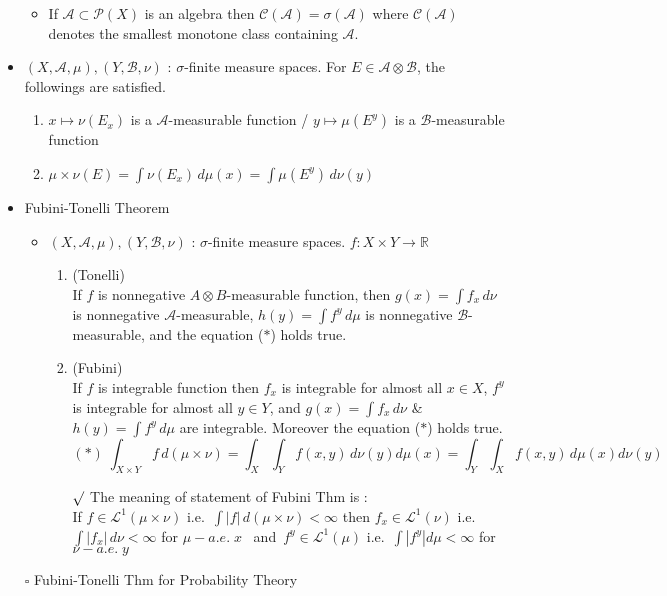\documentclass[12pt]{article}
\newcommand{\sq}{$\square$}
\newcommand{\rmk}{$\surd$}
\newcommand{\R}{\mathbb{R}}
\newcommand{\A}{\mathcal{A}}
\newcommand{\B}{\mathcal{B}}
\newcommand{\C}{\mathcal{C}}
\newcommand{\LL}{\mathcal{L}}
\begin{document}
\begin{itemize}
    \begin{itemize}
        \item If $\A\subset \mathcal{P}(X)$ is an algebra then $\C(\A)=\sigma(\A)$ where $\C(\A)$ denotes the smallest monotone class containing $\A$.
    \end{itemize}
\clearpage
    \item $(X, \A, \mu), (Y,\B, \nu)$ : $\sigma$-finite measure spaces. For $E\in \A\otimes \B$, the followings are satisfied.
    \begin{enumerate}
        \item $x\mapsto \nu(E_x)$ is a $\A$-measurable function / $y\mapsto \mu(E^y)$ is a $\B$-measurable function
        \item $\mu\times\nu(E)=\int \nu(E_x)\,d\mu(x)=\int \mu(E^y)\,d\nu(y)$
    \end{enumerate}
    \item Fubini-Tonelli Theorem
    \begin{itemize}
        \item $(X, \A, \mu), (Y,\B, \nu)$ : $\sigma$-finite measure spaces. $f: X\times Y\rightarrow \R$
        \begin{enumerate}
            \item (Tonelli) \\ If $f$ is nonnegative $A\otimes B$-measurable function, then $g(x)=\int f_x\,d\nu$ is nonnegative $\A$-measurable, $h(y)=\int f^y\,d\mu$ is nonnegative $\B$-measurable, and the equation ($*$) holds true.
            \item (Fubini) \\ If $f$ is integrable function then $f_x$ is integrable for almost all $x\in X$, $f^y$ is integrable for almost all $y\in Y$, and $g(x)=\int f_x\,d\nu$ \& $h(y)=\int f^y\,d\mu$ are integrable. Moreover the equation ($*$) holds true. $$(*)\; \int_{X\times Y} f\, d(\mu\times \nu)=\int_{X}\int_{Y} f(x,y)\,d\nu(y)d\mu(x)=\int_{Y}\int_{X} f(x,y)\,d\mu(x)d\nu(y)$$
            \item[\rmk] The meaning of statement of Fubini Thm is : \\ If $f\in \LL^1(\mu\times\nu)$ \; i.e.\, $\int |f|\, d(\mu\times \nu)<\infty$ then $f_x\in \LL^1(\nu)$ \; i.e.\, $\int |f_x|\,d\nu<\infty$ for $\mu-a.e. \; x$ \, and\, $f^y\in \LL^1(\mu)$ \; i.e.\, $\int |f^y|d\mu<\infty$ for $\nu-a.e. \; y$
        \end{enumerate}
    \end{itemize}
    \item [\sq] Fubini-Tonelli Thm for Probability Theory

\end{itemize}
\end{document}
